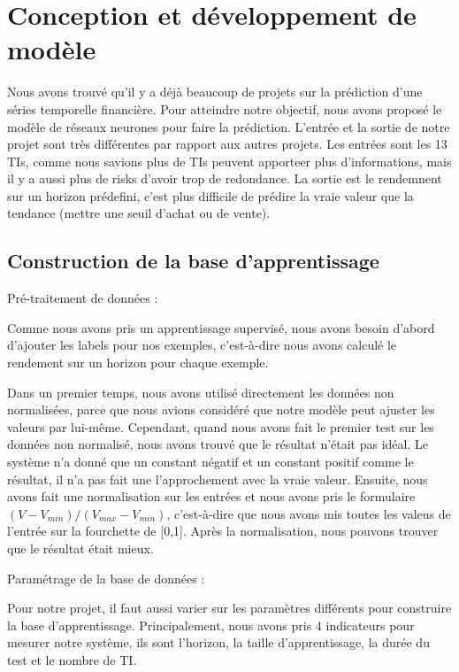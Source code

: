 

\section{Conception et développement de modèle}

Nous avons trouvé qu’il y a déjà beaucoup de projets sur la prédiction d’une séries temporelle financière. Pour atteindre notre objectif, nous avons proposé le modèle de réseaux neurones pour faire la prédiction. L’entrée et la sortie de notre projet sont très différentes par rapport aux autres projets. Les entrées sont les 13 TIs, comme nous savions plus de TIs peuvent apporteer plus d’informations, mais il y a aussi plus de risks d’avoir trop de redondance. La sortie est le rendemnent sur un horizon prédefini, c’est plus difficile de prédire la vraie valeur que la tendance (mettre une seuil d’achat ou de vente).

\subsection{Construction de la base d’apprentissage}

Pré-traitement de données : 

Comme nous avons pris un apprentissage supervisé, nous avons besoin d’abord d’ajouter les labels pour nos exemples, c’est-à-dire nous avons calculé le rendement sur un horizon pour chaque exemple.

Dans un premier temps, nous avons utilisé directement les données non normalisées, parce que nous avions considéré que notre modèle peut ajuster les valeurs par lui-même. Cependant, quand nous avons fait le premier test sur les données non normalisé, nous avons trouvé que le résultat n’était pas idéal. Le système n’a donné que un constant négatif et un constant positif comme le résultat, il n’a pas fait une l’approchement avec la vraie valeur. Ensuite, nous avons fait une normalisation sur les entrées et nous avons pris le formulaire $(V-V_{min})/(V_{max}-V_{min})$, c’est-à-dire que nous avons mis toutes les valeus de l’entrée sur la fourchette de [0,1]. Après la normalisation, nous pouvons trouver que le résultat était mieux.

Paramétrage de la base de données : 

Pour notre projet, il faut aussi varier sur les paramètres différents pour construire la base d'apprentissage. Principalement, nous avons pris 4 indicateurs pour mesurer notre système, ils sont l'horizon, la taille d'apprentissage, la durée du test et le nombre de TI.

